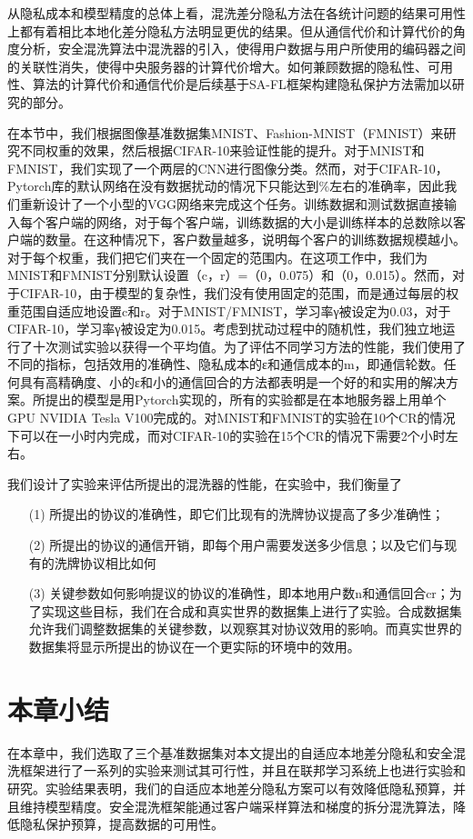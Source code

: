 从隐私成本和模型精度的总体上看，混洗差分隐私方法在各统计问题的结果可用性上都有着相比本地化差分隐私方法明显更优的结果。但从通信代价和计算代价的角度分析，安全混洗算法中混洗器的引入，使得用户数据与用户所使用的编码器之间的关联性消失，使得中央服务器的计算代价增大。如何兼顾数据的隐私性、可用性、算法的计算代价和通信代价是后续基于SA-FL框架构建隐私保护方法需加以研究的部分。

在本节中，我们根据图像基准数据集MNIST、Fashion-MNIST（FMNIST）来研究不同权重的效果，然后根据CIFAR-10来验证性能的提升。对于MNIST和FMNIST，我们实现了一个两层的CNN进行图像分类。然而，对于CIFAR-10，Pytorch库的默认网络在没有数据扰动的情况下只能达到\%左右的准确率，因此我们重新设计了一个小型的VGG网络来完成这个任务。训练数据和测试数据直接输入每个客户端的网络，对于每个客户端，训练数据的大小是训练样本的总数除以客户端的数量。在这种情况下，客户数量越多，说明每个客户的训练数据规模越小。对于每个权重，我们把它们夹在一个固定的范围内。在这项工作中，我们为MNIST和FMNIST分别默认设置（c，r）=（0，0.075）和（0，0.015）。然而，对于CIFAR-10，由于模型的复杂性，我们没有使用固定的范围，而是通过每层的权重范围自适应地设置c和r。对于MNIST/FMNIST，学习率γ被设定为0.03，对于CIFAR-10，学习率γ被设定为0.015。考虑到扰动过程中的随机性，我们独立地运行了十次测试实验以获得一个平均值。为了评估不同学习方法的性能，我们使用了不同的指标，包括效用的准确性、隐私成本的ε和通信成本的m，即通信轮数。任何具有高精确度、小的ε和小的通信回合的方法都表明是一个好的和实用的解决方案。所提出的模型是用Pytorch实现的，所有的实验都是在本地服务器上用单个GPU NVIDIA Tesla V100完成的。对MNIST和FMNIST的实验在10个CR的情况下可以在一小时内完成，而对CIFAR-10的实验在15个CR的情况下需要2个小时左右。

我们设计了实验来评估所提出的混洗器的性能，在实验中，我们衡量了
\begin{enumerate}
\item [(1)] 所提出的协议的准确性，即它们比现有的洗牌协议提高了多少准确性；
\item [(2)] 所提出的协议的通信开销，即每个用户需要发送多少信息；以及它们与现有的洗牌协议相比如何
\item [(3)] 关键参数如何影响提议的协议的准确性，即本地用户数n和通信回合cr；为了实现这些目标，我们在合成和真实世界的数据集上进行了实验。合成数据集允许我们调整数据集的关键参数，以观察其对协议效用的影响。而真实世界的数据集将显示所提出的协议在一个更实际的环境中的效用。
\end{enumerate}


\section{本章小结}
在本章中，我们选取了三个基准数据集对本文提出的自适应本地差分隐私和安全混洗框架进行了一系列的实验来测试其可行性，并且在联邦学习系统上也进行实验和研究。实验结果表明，我们的自适应本地差分隐私方案可以有效降低隐私预算，并且维持模型精度。安全混洗框架能通过客户端采样算法和梯度的拆分混洗算法，降低隐私保护预算，提高数据的可用性。

